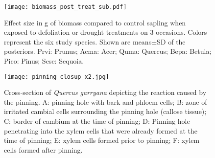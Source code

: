 \documentclass{article}
\begin{document}
	\begin{figure}[H]
		\centering
		\begin{minipage}[t]{0.5\textwidth} %
			\vspace{0pt} %
			\texttt{[image: biomass\_post\_treat\_sub.pdf]}
		\end{minipage}%
		\hfill
		\begin{minipage}[t]{0.5\textwidth} %
			\vspace{0pt} %
			\caption{Effect size in g of biomass compared to control sapling when exposed to defoliation or drought treatments on 3 occasions. Colors represent the six study species. Shown are means±SD of the posteriors. Prvi: Prunus; Acma: Acer; Quma: Quercus; Bepa: Betula; Pico: Pinus; Sese: Sequoia.}
			\label{fig:biomass_post_treat_sub}
		\end{minipage}
	\end{figure}

	
	
		\begin{figure}[H]
		\centering
		\begin{minipage}[t]{0.6\textwidth} %
			\vspace{0pt} %
			\texttt{[image: pinning\_closup\_x2.jpg]}
		\end{minipage}%
		\hfill
		\begin{minipage}[t]{0.4\textwidth} %
			\vspace{0pt} %
			\caption{Cross-section of \textit{Quercus garryana} depicting the reaction caused by the pinning. A: pinning hole with bark and phloem cells; B: zone of irritated cambial cells surrounding the pinning hole (callose tissue); C: border of cambium at the time of pinning; D: Pinning hole penetrating into the xylem cells that were already formed at the time of pinning; E: xylem cells formed prior to pinning; F: xylem cells formed after pinning.}
			\label{fig:pinning_closup_x2}
		\end{minipage}
	\end{figure}
	
\end{document}
